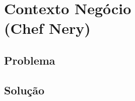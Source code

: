 
\chapter[Contexto do Negócio]{Contexto Negócio \\ (Chef Nery)}
{\large {\section { Problema \\ } } }


{\large {\section { Solução \\ } } }

